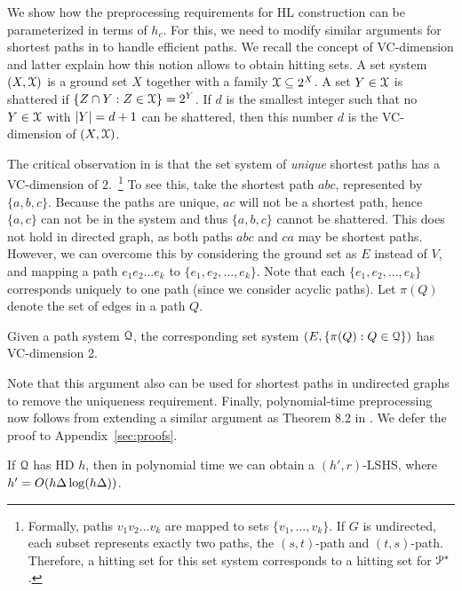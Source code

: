 We show how the preprocessing requirements for HL construction can be parameterized in terms of $h_c$. For this, we need to modify similar arguments for shortest paths in \cite{highway2013} to handle efficient paths.
We recall the concept of VC-dimension and latter explain how this notion allows to obtain hitting sets.
A set system $(X,\mathcal{X})$ is a ground set $X$ together with a family $\mathcal{X}\subseteq 2^X$.
A set $Y\in \mathcal{X}$ is shattered if $\{Z\cap Y:Z\in\mathcal{X}\}=2^Y$.
If $d$ is the smallest integer such that no $Y\in\mathcal{X}$ with $\lvert Y\rvert=d+1$ can be shattered, then this number $d$ is the VC-dimension of $(X,\mathcal{X})$.

The critical observation in \cite{highway2013} is that the set system of \emph{unique} shortest paths has a VC-dimension of $2$.~\footnote{
Formally, paths $v_1v_2\ldots v_k$ are mapped to sets $\{v_1,\ldots,v_k\}$. If $G$ is undirected, each subset represents exactly two paths, the $(s,t)$-path and $(t,s)$-path. Therefore, a hitting set for this set system corresponds to a hitting set for $\mathcal{P}^*$.}
To see this, take the shortest path $abc$, represented by $\{a,b,c\}$. Because the paths are unique, $ac$ will not be a shortest path, hence $\{a,c\}$ can not be in the system and thus $\{a,b,c\}$ cannot be shattered.
This does not hold in directed graph, as both paths $abc$ and $ca$ may be shortest paths. However, we can overcome this by considering the ground set as $E$ instead of $V$, and mapping a path $e_1e_2\ldots e_k$ to $\{e_1,e_2,\ldots,e_k\}$.
Note that each $\{e_1,e_2,\ldots,e_k\}$ corresponds uniquely to one path (since we consider acyclic paths).
Let $\pi(Q)$ denote the set of edges in a path $Q$.
\begin{proposition}
Given a path system $\mathcal{Q}$, the corresponding set system $(E,\{\pi(Q):Q\in\mathcal{Q}\})$ has VC-dimension 2.
\end{proposition}
Note that this argument also can be used for shortest paths in undirected graphs to remove the uniqueness requirement.
Finally, polynomial-time preprocessing now follows from extending a similar argument as Theorem 8.2 in \cite{highway2013}.
We defer the proof to Appendix~\ref{sec:proofs}.

\begin{proposition}\label{prop:poly_lshs}
If $\mathcal{Q}$ has HD $h$, then in polynomial time we can obtain a $(h',r)$-LSHS, where $h'=O(h\Delta\log(h\Delta))$.	
\end{proposition}